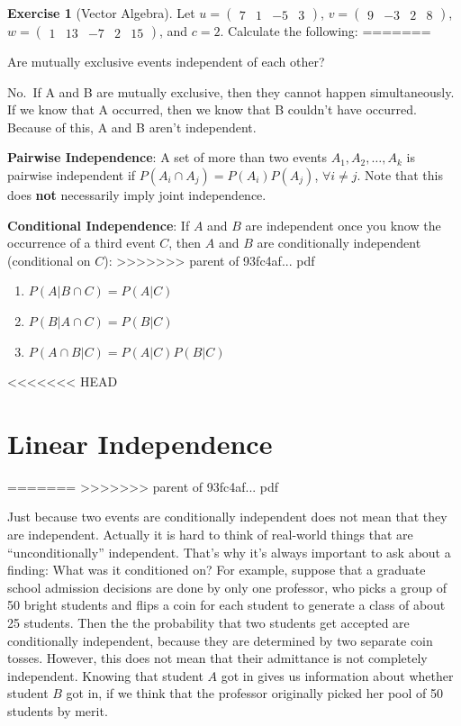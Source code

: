 \documentclass[]{book}
\providecommand{\tightlist}{%
  \setlength{\itemsep}{0pt}\setlength{\parskip}{0pt}}
\theoremstyle{definition}
\theoremstyle{definition}
\theoremstyle{definition}
\newtheorem{exercise}{Exercise}[chapter]
\theoremstyle{remark}
\begin{document}
\begin{exercise}[Vector Algebra]
\protect\hypertarget{exr:vectors1}{}{\label{exr:vectors1} {} }
Let \(u = \begin{pmatrix} 7&1&-5&3\end{pmatrix}\), \(v = \begin{pmatrix} 9&-3&2&8 \end{pmatrix}\), \(w = \begin{pmatrix} 1&13& -7&2 &15 \end{pmatrix}\), and \(c = 2\). Calculate the following:
=======

Are mutually exclusive events independent of each other?

No.~If A and B are mutually exclusive, then they cannot happen simultaneously. If we know that A occurred, then we know that B couldn't have occurred. Because of this, A and B aren't independent.

\textbf{Pairwise Independence}: A set of more than two events \(A_1, A_2, \dots, A_k\) is pairwise independent if \(P(A_i\cap A_j)=P(A_i)P(A_j)\), \(\forall i\neq j\). Note that this does \textbf{not} necessarily imply joint independence.

\textbf{Conditional Independence}: If \(A\) and \(B\) are independent once you know the occurrence of a third event \(C\), then \(A\) and \(B\) are conditionally independent (conditional on \(C\)):
>>>>>>> parent of 93fc4af... pdf

\begin{enumerate}
\def\labelenumi{\arabic{enumi}.}
\tightlist
\item
  \(P(A|B \cap C)=P(A|C)\)
\item
  \(P(B|A \cap C)=P(B|C)\)
\item
  \(P(A\cap B|C)=P(A|C)P(B|C)\)
\end{enumerate}
<<<<<<< HEAD
\end{exercise}

\hypertarget{linearindependence}{%
\section{Linear Independence}\label{linearindependence}}
=======
>>>>>>> parent of 93fc4af... pdf

Just because two events are conditionally independent does not mean that they are independent. Actually it is hard to think of real-world things that are ``unconditionally'' independent. That's why it's always important to ask about a finding: What was it conditioned on? For example, suppose that a graduate school admission decisions are done by only one professor, who picks a group of 50 bright students and flips a coin for each student to generate a class of about 25 students. Then the the probability that two students get accepted are conditionally independent, because they are determined by two separate coin tosses. However, this does not mean that their admittance is not completely independent. Knowing that student \(A\) got in gives us information about whether student \(B\) got in, if we think that the professor originally picked her pool of 50 students by merit.
\end{document}

